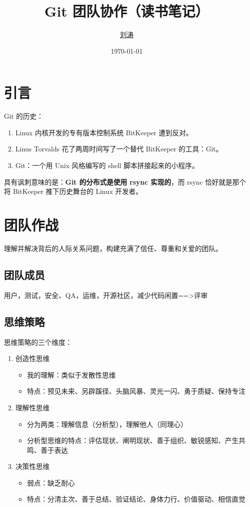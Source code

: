 \documentclass[cn,pad,11pt,green,geye]{../elegantnote}
\title{Git 团队协作（读书笔记）}
\author{\href{https://github.com/lightjameslyy/}{刘涛}}
\institute{中科院计算所}
\date{\today}
\begin{document}
\maketitle


\section*{引言}
Git 的历史：
\begin{enumerate}
   \item Linux 内核开发的专有版本控制系统 BitKeeper 遭到反对。
   \item Linus Torvalds 花了两周时间写了一个替代 BitKeeper 的工具：Git。
   \item Git：一个用 Unix 风格编写的 shell 脚本拼接起来的小程序。
\end{enumerate}

\begin{note}
具有讽刺意味的是：\textbf{Git 的分布式是使用 rsync 实现的}，而 rsync 恰好就是那个将 BitKeeper 推下历史舞台的 Linux 开发者。
\end{note}

\section{团队作战}
理解并解决背后的人际关系问题，构建充满了信任、尊重和关爱的团队。

\subsection{团队成员}
用户，测试，安全、QA，运维，开源社区，减少代码闲置==>评审

\subsection{思维策略}
思维策略的三个维度：
\begin{enumerate}
   \item 创造性思维
      \begin{itemize}
         \item 我的理解：类似于发散性思维
         \item 特点：预见未来、另辟蹊径、头脑风暴、灵光一闪、勇于质疑、保持专注
      \end{itemize}
   \item 理解性思维
      \begin{itemize}
         \item 分为两类：理解信息（分析型），理解他人（同理心）
         \item 分析型思维的特点：评估现状、阐明现状、善于组织、敏锐感知、产生共鸣、善于表达
      \end{itemize}
   \item 决策性思维
      \begin{itemize}
         \item 弱点：缺乏耐心
         \item 特点：分清主次、善于总结、验证结论、身体力行、价值驱动、相信直觉
      \end{itemize}
\end{enumerate}
\end{document}
